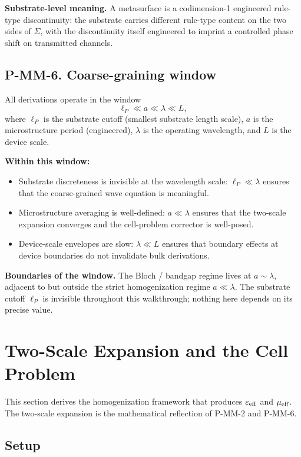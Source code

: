\documentclass[11pt,a4paper]{article}
\begin{document}
\textbf{Substrate-level meaning.} A metasurface is a codimension-1 engineered rule-type discontinuity: the substrate carries different rule-type content on the two sides of $\Sigma$, with the discontinuity itself engineered to imprint a controlled phase shift on transmitted channels.

\subsection{P-MM-6. Coarse-graining window}

All derivations operate in the window
\[
\ell_P \ll a \ll \lambda \ll L,
\]
where $\ell_P$ is the substrate cutoff (smallest substrate length scale), $a$ is the microstructure period (engineered), $\lambda$ is the operating wavelength, and $L$ is the device scale.

\textbf{Within this window:}
\begin{itemize}[noitemsep]
\item Substrate discreteness is invisible at the wavelength scale: $\ell_P \ll \lambda$ ensures that the coarse-grained wave equation is meaningful.
\item Microstructure averaging is well-defined: $a \ll \lambda$ ensures that the two-scale expansion converges and the cell-problem corrector is well-posed.
\item Device-scale envelopes are slow: $\lambda \ll L$ ensures that boundary effects at device boundaries do not invalidate bulk derivations.
\end{itemize}

\textbf{Boundaries of the window.} The Bloch / bandgap regime lives at $a \sim \lambda$, adjacent to but outside the strict homogenization regime $a \ll \lambda$. The substrate cutoff $\ell_P$ is invisible throughout this walkthrough; nothing here depends on its precise value.

\section{Two-Scale Expansion and the Cell Problem}

This section derives the homogenization framework that produces $\varepsilon_{\rm eff}$ and $\mu_{\rm eff}$. The two-scale expansion is the mathematical reflection of P-MM-2 and P-MM-6.

\subsection{Setup}
\end{document}
